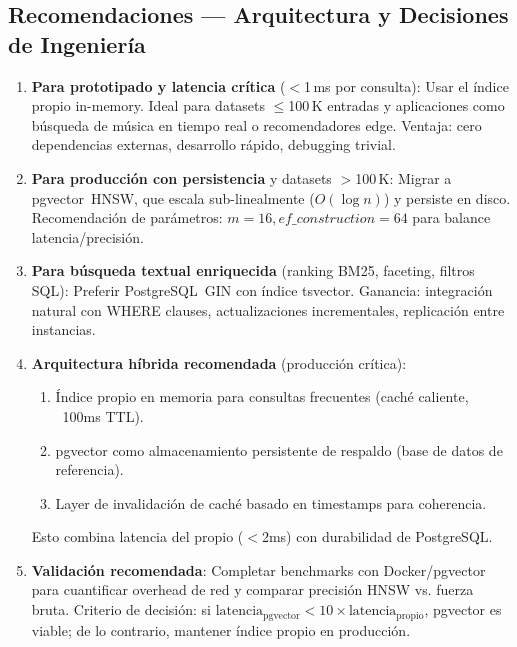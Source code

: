 \documentclass[12pt,a4paper]{article}
\begin{document}
\subsection{Recomendaciones — Arquitectura y Decisiones de Ingeniería}

\begin{enumerate}[leftmargin=*, label=\arabic*.]
  \item \textbf{Para prototipado y latencia crítica} ($<$1\,ms por consulta):
        Usar el índice propio in-memory. Ideal para datasets $\leq$100\,K entradas y aplicaciones
        como búsqueda de música en tiempo real o recomendadores edge. Ventaja: cero dependencias externas,
        desarrollo rápido, debugging trivial.

  \item \textbf{Para producción con persistencia} y datasets $>$100\,K:
        Migrar a pgvector~HNSW, que escala sub-linealmente ($O(\log n)$) y persiste en disco.
        Recomendación de parámetros: $m=16, ef\_construction=64$ para balance latencia/precisión.

  \item \textbf{Para búsqueda textual enriquecida} (ranking BM25, faceting, filtros SQL):
        Preferir PostgreSQL~GIN con índice tsvector. Ganancia: integración natural con WHERE clauses,
        actualizaciones incrementales, replicación entre instancias.

  \item \textbf{Arquitectura híbrida recomendada} (producción crítica):
        \begin{enumerate}[label=\alph*.]
          \item Índice propio en memoria para consultas frecuentes (caché caliente, ~100ms TTL).
          \item pgvector como almacenamiento persistente de respaldo (base de datos de referencia).
          \item Layer de invalidación de caché basado en timestamps para coherencia.
        \end{enumerate}
        Esto combina latencia del propio ($<$2ms) con durabilidad de PostgreSQL.

  \item \textbf{Validación recomendada}: Completar benchmarks con Docker/pgvector para
        cuantificar overhead de red y comparar precisión HNSW vs. fuerza bruta.
        Criterio de decisión: si $\text{latencia}_{\text{pgvector}} < 10 \times \text{latencia}_{\text{propio}}$,
        pgvector es viable; de lo contrario, mantener índice propio en producción.
\end{enumerate}
\end{document}
